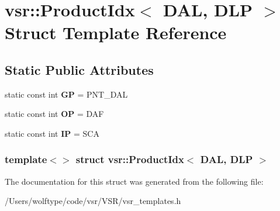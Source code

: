 \hypertarget{structvsr_1_1_product_idx_3_01_d_a_l_00_01_d_l_p_01_4}{\section{vsr\-:\-:Product\-Idx$<$ D\-A\-L, D\-L\-P $>$ Struct Template Reference}
\label{structvsr_1_1_product_idx_3_01_d_a_l_00_01_d_l_p_01_4}
}
\subsection*{Static Public Attributes}
\begin{DoxyCompactItemize}
\item 
\hypertarget{structvsr_1_1_product_idx_3_01_d_a_l_00_01_d_l_p_01_4_a8525b05854a04f691adf44b948fb1ee6}{static const int {\bfseries G\-P} = P\-N\-T\-\_\-\-D\-A\-L}\label{structvsr_1_1_product_idx_3_01_d_a_l_00_01_d_l_p_01_4_a8525b05854a04f691adf44b948fb1ee6}

\item 
\hypertarget{structvsr_1_1_product_idx_3_01_d_a_l_00_01_d_l_p_01_4_aca8587aedb1c76775863d4cf1595cfe0}{static const int {\bfseries O\-P} = D\-A\-F}\label{structvsr_1_1_product_idx_3_01_d_a_l_00_01_d_l_p_01_4_aca8587aedb1c76775863d4cf1595cfe0}

\item 
\hypertarget{structvsr_1_1_product_idx_3_01_d_a_l_00_01_d_l_p_01_4_af3347c7ee0ae7d9a9c7e69e1106a958f}{static const int {\bfseries I\-P} = S\-C\-A}\label{structvsr_1_1_product_idx_3_01_d_a_l_00_01_d_l_p_01_4_af3347c7ee0ae7d9a9c7e69e1106a958f}

\end{DoxyCompactItemize}
\subsubsection*{template$<$$>$ struct vsr\-::\-Product\-Idx$<$ D\-A\-L, D\-L\-P $>$}



The documentation for this struct was generated from the following file\-:\begin{DoxyCompactItemize}
\item 
/\-Users/wolftype/code/vsr/\-V\-S\-R/vsr\-\_\-templates.\-h\end{DoxyCompactItemize}
